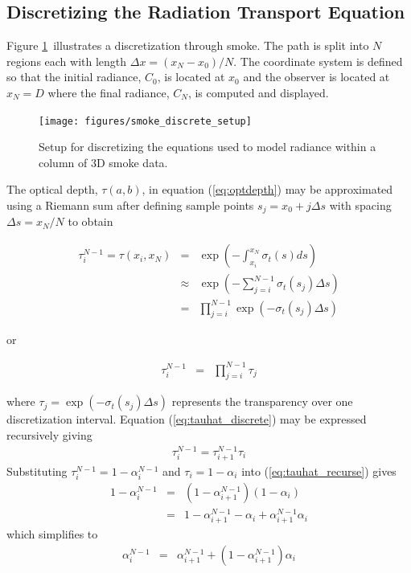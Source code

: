 \subsection{Discretizing the Radiation Transport Equation}
\newcommand{\htau}[1]{\tau_{#1}^{N-1}}
\newcommand{\halpha}[1]{\alpha_{#1}^{N-1}}
\newcommand{\sigai}[1]{\sigma_{a,#1}}
\newcommand{\Lei}[1]{C_{e,#1}}
\newcommand{\Lhatj}[1]{C_{#1}^N}
\newcommand{\Lhatjj}[1]{\hat{C}_{#1}^N}
\newcommand{\Chatjj}[1]{\hat{C}_{#1}^N}
\newcommand{\Leii}[1]{\hat{C}_{e,#1}}


Figure \ref{fig:smokediscretesetup}\ illustrates a discretization through  smoke.  The path is split into $N$ regions each with length $\Delta x=(x_N-x_0)/N$.  The coordinate system is defined so that the initial radiance, $C_0$, is located at $x_0$ and the observer is located at $x_N=D$  where the final radiance, $C_N$, is computed and displayed.

\begin{figure}[\figoptions]
\begin{center}
\texttt{[image: figures/smoke\_discrete\_setup]}
\end{center}
\caption {Setup for discretizing the equations used to model
radiance within a column of 3D smoke data.}
\label{fig:smokediscretesetup}
\end{figure}

The optical depth, $\tau(a,b)$, in equation (\ref{eq:optdepth}) may be approximated using a Riemann sum  after defining sample points $s_j=x_0+j\Delta s$ with spacing $\Delta s=x_N/N$ to obtain

\begin{eqnarray*}
\htau{i}=\tau(x_i,x_N)&=&\exp\left(-\int_{x_i}^{x_N}\sigma_t(s)ds\right)\\
&\approx&\exp\left(-\sum_{j=i}^{N-1}\sigma_t(s_j)\Delta s\right)\\
&=&\prod_{j=i}^{N-1}\exp\left(-\sigma_t(s_j)\Delta s\right)
\end{eqnarray*}

or

\begin{eqnarray}
\label{eq:tauhat_discrete}
\htau{i}&=&\prod_{j=i}^{N-1}\tau_j
\end{eqnarray}

where $\tau_j=\exp\left(-\sigma_t(s_j)\Delta s\right)$ represents the transparency over one discretization interval.
Equation (\ref{eq:tauhat_discrete}) may be expressed recursively giving
\begin{eqnarray}
\label{eq:tauhat_recurse}
\htau{i}=\htau{i+1}\tau_i
\end{eqnarray}
Substituting $\htau{i}=1-\halpha{i}$ and $\tau_i=1-\alpha_i$ into (\ref{eq:tauhat_recurse}) gives
\begin{eqnarray*}
1-\halpha{i}&=&(1-\halpha{i+1})(1-\alpha_i)\\
&=&1-\halpha{i+1} - \alpha_i + \halpha{i+1}\alpha_i
\end{eqnarray*}
which simplifies to
\begin{eqnarray*}
\halpha{i}&=&\halpha{i+1} + (1-\halpha{i+1})\alpha_i
\end{eqnarray*}

